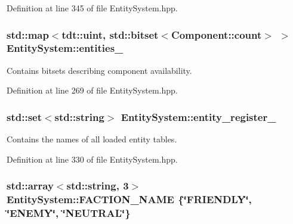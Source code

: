 Definition at line 345 of file Entity\+System.\+hpp.

\subsubsection[{\texorpdfstring{entities\+\_\+}{entities_}}]{\setlength{\rightskip}{0pt plus 5cm}std\+::map$<$tdt\+::uint, std\+::bitset$<$Component\+::count$>$ $>$ Entity\+System\+::entities\+\_\+\hspace{0.3cm}{\ttfamily [private]}}\hypertarget{class_entity_system_a830f1669703edf2e3d6271c3732f8ef5}{}\label{class_entity_system_a830f1669703edf2e3d6271c3732f8ef5}


Contains bitsets describing component availability. 



Definition at line 269 of file Entity\+System.\+hpp.

\subsubsection[{\texorpdfstring{entity\+\_\+register\+\_\+}{entity_register_}}]{\setlength{\rightskip}{0pt plus 5cm}std\+::set$<$std\+::string$>$ Entity\+System\+::entity\+\_\+register\+\_\+\hspace{0.3cm}{\ttfamily [private]}}\hypertarget{class_entity_system_a9a0d1920f8346e07201faf8d6c5b1ecf}{}\label{class_entity_system_a9a0d1920f8346e07201faf8d6c5b1ecf}


Contains the names of all loaded entity tables. 



Definition at line 330 of file Entity\+System.\+hpp.

\subsubsection[{\texorpdfstring{F\+A\+C\+T\+I\+O\+N\+\_\+\+N\+A\+ME}{FACTION_NAME}}]{\setlength{\rightskip}{0pt plus 5cm}std\+::array$<$std\+::string, 3$>$ Entity\+System\+::\+F\+A\+C\+T\+I\+O\+N\+\_\+\+N\+A\+ME \{\char`\"{}F\+R\+I\+E\+N\+D\+LY\char`\"{}, \char`\"{}E\+N\+E\+MY\char`\"{}, \char`\"{}N\+E\+U\+T\+R\+AL\char`\"{}\}}\hypertarget{class_entity_system_a64eff1a78f8685a3b8319b5219381963}{}\label{class_entity_system_a64eff1a78f8685a3b8319b5219381963}


